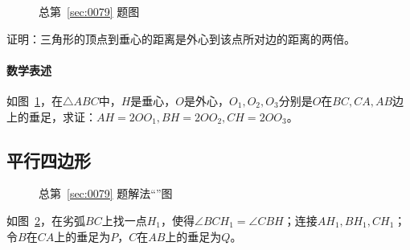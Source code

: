 

\begin{figure}[htbp]
  \centering
  \caption{总第~\ref{sec:0079} 题图} \label{fig:0079}
\end{figure}

证明：三角形的顶点到垂心的距离是外心到该点所对边的距离的两倍。

\paragraph{数学表述} 如图~\ref{fig:0079}，在$\triangle ABC$中，$H$是垂心，$O$是外心，$O_1, O_2, O_3$分别是$O$在$BC, CA, AB$边上的垂足，求证：$AH = 2OO_1, BH = 2OO_2, CH = 2OO_3$。

\subsection{平行四边形} \label{subsec:0079-par}

\begin{figure}[htbp]
  \centering
  \caption{总第~\ref{sec:0079} 题解法“”图}
  \label{fig:0079-par}
\end{figure}

如图~\ref{fig:0079-par}，在劣弧$BC$上找一点$H_1$，使得$\angle BCH_1 = \angle CBH$；连接$AH_1, BH_1, CH_1$；令$B$在$CA$上的垂足为$P$，$C$在$AB$上的垂足为$Q$。

